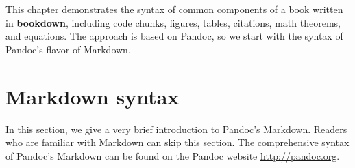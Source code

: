 \documentclass[]{krantz}
\begin{document}
This chapter demonstrates the syntax of common components of a book written in \textbf{bookdown}, including code chunks, figures, tables, citations, math theorems, and equations. The approach is based on Pandoc, so we start with the syntax of Pandoc's flavor of Markdown.

\hypertarget{markdown-syntax-1}{%
\section{Markdown syntax}\label{markdown-syntax-1}}

In this section, we give a very brief introduction to Pandoc's Markdown. Readers who are familiar with Markdown can skip this section. The comprehensive syntax of Pandoc's Markdown can be found on the Pandoc website \url{http://pandoc.org}.



\printindex
\end{document}

